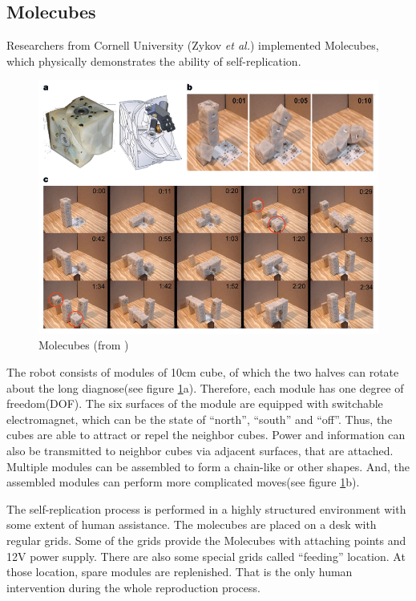 \documentclass[12pt,twoside]{article}
\theoremstyle{plain}
\theoremstyle{definition}
\theoremstyle{remark}
\newcommand{\etal}{\textit{et al.}}
\begin{document}
\subsection{Molecubes}
Researchers from Cornell University (Zykov \etal) implemented Molecubes, which physically demonstrates the ability of self-replication\cite{zykov_self-reproducing_2005}\cite{zykov_evolved_2007}. 

\begin{figure}[t]
	 \centerline{\includegraphics[width=\textwidth]{molecubes}}
	 {\caption{Molecubes (from \cite{zykov_self-reproducing_2005})}
	 \label{fig:mole}}
\end{figure}

The robot consists of modules of 10cm cube, of which the two halves can rotate about the long diagnose(see figure \ref{fig:mole}a). Therefore, each module has one degree of freedom(DOF). The six surfaces of the module are equipped with switchable electromagnet, which can be the state of ``north'', ``south'' and ``off''. Thus, the cubes are able to attract or repel the neighbor cubes. Power and information can also be transmitted to neighbor cubes via adjacent surfaces, that are attached. Multiple modules can be assembled to form a chain-like or other shapes. And, the assembled modules can perform more complicated moves(see figure \ref{fig:mole}b). 

The self-replication process is performed in a highly structured environment with some extent of human assistance. The molecubes are placed on a desk with regular grids. Some of the grids provide the Molecubes with attaching points and 12V power supply. There are also some special grids called ``feeding'' location. At those location, spare modules are replenished. That is the only human intervention during the whole reproduction process.
\end{document}
